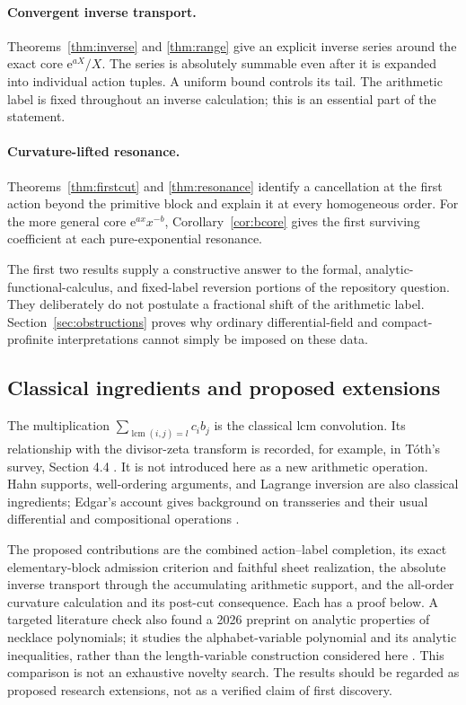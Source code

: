 \documentclass[11pt,a4paper]{article}
\numberwithin{equation}{section}
\theoremstyle{definition}
\theoremstyle{remark}
\newcommand{\ee}{\mathrm e}
\newcommand{\lcm}{\operatorname{lcm}}
\begin{document}
\paragraph{Convergent inverse transport.}
Theorems~\ref{thm:inverse} and \ref{thm:range} give an explicit inverse
series around the exact core $\ee^{aX}/X$. The series is absolutely
summable even after it is expanded into individual action tuples. A
uniform bound controls its tail. The arithmetic label is fixed throughout
an inverse calculation; this is an essential part of the statement.

\paragraph{Curvature-lifted resonance.}
Theorems~\ref{thm:firstcut} and \ref{thm:resonance} identify a cancellation
at the first action beyond the primitive block and explain it at every
homogeneous order. For the more general core $\ee^{ax}x^{-b}$,
Corollary~\ref{cor:bcore} gives the first surviving coefficient at each
pure-exponential resonance.

The first two results supply a constructive answer to the formal,
analytic-functional-calculus, and fixed-label reversion portions of the
repository question. They deliberately do not postulate a fractional
shift of the arithmetic label. Section~\ref{sec:obstructions} proves why
ordinary differential-field and compact-profinite interpretations cannot
simply be imposed on these data.

\subsection{Classical ingredients and proposed extensions}

The multiplication
$\sum_{\lcm(i,j)=l}c_i b_j$ is the classical lcm convolution. Its
relationship with the divisor-zeta transform is recorded, for example, in
T\'oth's survey, Section 4.4 \cite{toth}. It is not introduced here as a
new arithmetic operation. Hahn supports, well-ordering arguments, and
Lagrange inversion are also classical ingredients; Edgar's account gives
background on transseries and their usual differential and compositional
operations \cite{edgar}.

The proposed contributions are the combined action--label completion,
its exact elementary-block admission criterion and faithful sheet
realization, the absolute inverse transport through the accumulating
arithmetic support, and the all-order curvature calculation and its
post-cut consequence. Each has a proof below. A targeted literature check
also found a 2026 preprint on analytic properties of necklace polynomials;
it studies the alphabet-variable polynomial and its analytic inequalities,
rather than the length-variable construction considered here
\cite{chebolu}. This comparison is not an exhaustive novelty search. The
results should be regarded as proposed research extensions, not as a
verified claim of first discovery.
\end{document}
